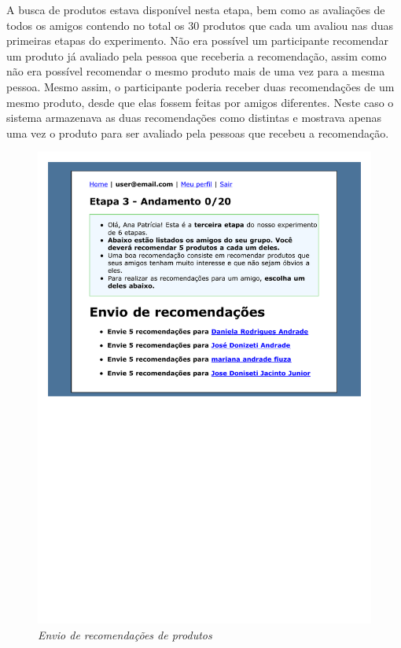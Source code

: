 A busca de produtos estava disponível nesta etapa, bem como as avaliações de todos os amigos contendo no total os 30 produtos que cada um avaliou nas duas primeiras etapas do experimento. Não era possível um participante recomendar um produto já avaliado pela pessoa que receberia a recomendação, assim como não era possível recomendar o mesmo produto mais de uma vez para a mesma pessoa. Mesmo assim, o participante poderia receber duas recomendações de um mesmo produto, desde que elas fossem feitas por amigos diferentes. Neste caso o sistema armazenava as duas recomendações como distintas e mostrava apenas uma vez o produto para ser avaliado pela pessoas que recebeu a recomendação.

\begin{figure}[htp]
  \centering
  \includegraphics[width=\textwidth]{imagens/stage-3}
  \caption{\it Envio de recomendações de produtos}
  \label{fig:stage-3}
\end{figure}

